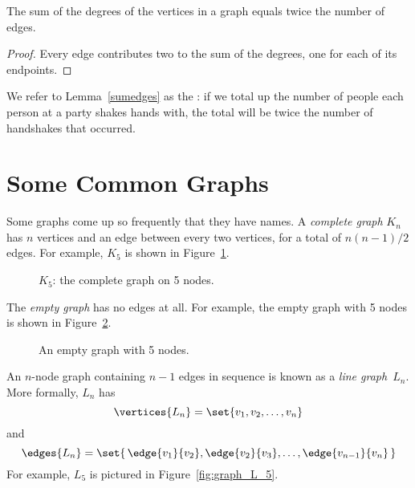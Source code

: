 \begin{lemma}\label{sumedges}
The sum of the degrees of the vertices in a graph equals twice the number of edges.
\end{lemma}

\begin{proof}
Every edge contributes two to the sum of the degrees, one for each of its endpoints.
\end{proof}

We refer to Lemma~\ref{sumedges} as the : if
we total up the number of people each person at a party shakes hands
with, the total will be twice the number of handshakes that occurred.

\begin{problems}

\practiceproblems

\classproblems
{}

\examproblems
{}
\end{problems}

\section{Some Common Graphs}\label{sec:common_graphs}

Some graphs come up so frequently that they have names.  A
\emph{complete graph}%
$K_n$ has $n$ vertices and an edge between
every two vertices, for a total of $n(n-1)/2$ edges.  For example,
$K_5$ is shown in Figure~\ref{fig:K_5}.

\begin{figure}


\caption{$K_5$: the complete graph on 5 nodes.}
\label{fig:K_5}
\end{figure}

The \emph{empty graph}%
has no edges at all.  For example, the empty
graph with 5 nodes is shown in Figure~\ref{fig:graph_empty_5}.

\begin{figure}


\caption{An empty graph with 5 nodes.}
\label{fig:graph_empty_5}
\end{figure}

An $n$-node graph containing $n - 1$ edges in sequence is known as
a \emph{line graph}~$L_n$.  More formally, $L_n$ has
\begin{equation*}
    \vertices{L_n} = \set{ v_1, v_2, \dots, v_n }
\end{equation*}
and
\begin{equation*}
    \edges{L_n} = \set{\, \edge{v_1}{v_2}, \edge{v_2}{v_3}, \dots,
    \edge{v_{n-1}}{v_n} \, }
\end{equation*}
For example, $L_5$ is pictured in Figure~\ref{fig:graph_L_5}.

